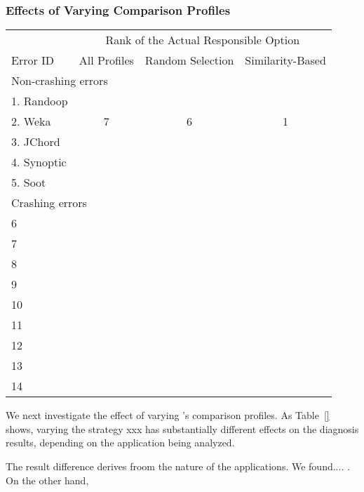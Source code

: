 \subsubsection{Effects of Varying Comparison Profiles}
\label{sec:ranking}


\begin{table}[t]
\setlength{\tabcolsep}{.24\tabcolsep}
\begin{tabular}{|l|c|c||c|}
\hline
  & \multicolumn{3}{|c|}{Rank of the Actual Responsible Option } \\
\cline{2-4}
 Error ID & All Profiles & Random Selection&  Similarity-Based\\
 \hline
\hline
\multicolumn{4}{|l|}{Non-crashing errors}   \\
 \hline
 1. Randoop & & &\\
 2. Weka & 7 & 6 & 1\\
 3. JChord & & &\\
 4. Synoptic & & &\\
 5. Soot & & &\\
\hline
\hline
\multicolumn{4}{|l|}{Crashing errors}   \\
\hline
 6 & & &\\
 7 & & &\\
 8 & & &\\
 9 & & &\\
 10 & & &\\
 11 & & &\\
 12 & & &\\
 13 & & &\\
 14 & & &\\
\hline
\end{tabular}

\end{table}


We next investigate the effect of varying \ourtool's
comparison profiles. As Table~\ref{} shows, varying the
strategy xxx has substantially different effects on the
diagnosis results, depending on the application being analyzed.

The result difference derives froom the nature of the applications.
We found....  . On the other hand,


